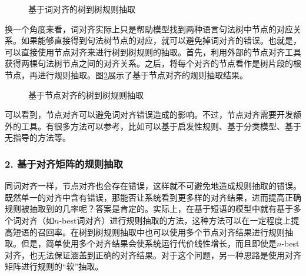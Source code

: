 \begin{figure}[htp]
\centering

\caption{基于词对齐的树到树规则抽取}
\label{fig:8-34}
\end{figure}

\parinterval 换一个角度来看，词对齐实际上只是帮助模型找到两种语言句法树中节点的对应关系。如果能够直接得到句法树节点的对应，就可以避免掉词对齐的错误。也就是，可以直接使用节点对齐来进行树到树规则的抽取。首先，利用外部的节点对齐工具获得两棵句法树节点之间的对齐关系。之后，将每个对齐的节点看作是树片段的根节点，再进行规则抽取。图\ref{fig:8-35}展示了基于节点对齐的规则抽取结果。

\begin{figure}[htb]
\centering

\caption{基于节点对齐的树到树规则抽取}
\label{fig:8-35}
\end{figure}

\parinterval 可以看到，节点对齐可以避免词对齐错误造成的影响。不过，节点对齐需要开发额外的工具。有很多方法可以参考，比如可以基于启发性规则、基于分类模型、基于无指导的方法等。


\subsubsection{2. 基于对齐矩阵的规则抽取}

\parinterval 同词对齐一样，节点对齐也会存在错误，这样就不可避免地造成规则抽取的错误。既然单一的对齐中含有错误，那能否让系统看到更多样的对齐结果，进而提高正确规则被抽取到的几率呢？答案是肯定的。实际上，在基于短语的模型中就有基于多个词对齐（如$n$-best词对齐）进行规则抽取的方法，这种方法可以在一定程度上提高短语的召回率。在树到树规则抽取中也可以使用多个节点对齐结果进行规则抽取。但是，简单使用多个对齐结果会使系统运行代价线性增长，而且即使是$n$-best对齐，也无法保证涵盖到正确的对齐结果。对于这个问题，另一种思路是使用对齐矩阵进行规则的“软”抽取。

